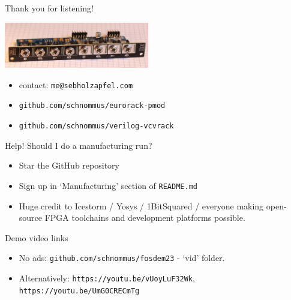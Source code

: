 \documentclass[aspectratio=169]{beamer}
\begin{document}
\begin{frame}{Thank you for listening!}

    \begin{center}
        \includegraphics[height=2cm]{img/eurorack-pmod.jpg}
    \end{center}

    \begin{itemize}
        \item contact: \texttt{me@sebholzapfel.com}
        \item \texttt{github.com/schnommus/eurorack-pmod}
        \item \texttt{github.com/schnommus/verilog-vcvrack}
    \end{itemize}

    \begin{block}{Help! Should I do a manufacturing run?}
        \begin{itemize}
            \item Star the GitHub repository
            \item Sign up in `Manufacturing' section of \texttt{README.md}
        \end{itemize}
    \end{block}

    \begin{itemize}
        \item Huge credit to Icestorm / Yosys / 1BitSquared / everyone making open-source FPGA toolchains and development platforms possible.
    \end{itemize}

\end{frame}

\begin{frame}{Demo video links}
    \begin{itemize}
        \item No ads: \texttt{github.com/schnommus/fosdem23} - `vid' folder.
        \item Alternatively: \texttt{https://youtu.be/vUoyLuF32Wk}, \texttt{https://youtu.be/UmG0CRECmTg}
    \end{itemize}
\end{frame}
\end{document}
